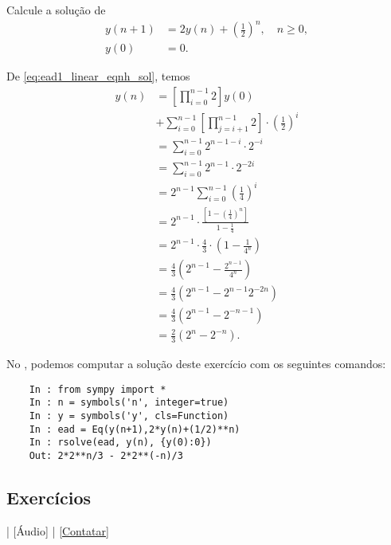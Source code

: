 \begin{exeresol}
  Calcule a solução de
  \begin{align}
    y(n+1) &= 2y(n) + \left(\frac{1}{2}\right)^n,\quad n\geq 0, \\
    y(0) &= 0.
  \end{align}
\end{exeresol}
\begin{resol}
  De \eqref{eq:ead1_linear_eqnh_sol}, temos
  \begin{align}
    y(n) &= \left[\prod_{i=0}^{n-1} 2\right]y(0) \nonumber\\
    &+ \sum_{i=0}^{n-1}\left[\prod_{j=i+1}^{n-1} 2\right]\cdot\left(\frac{1}{2}\right)^i \\
    &= \sum_{i=0}^{n-1} 2^{n-1-i}\cdot 2^{-i} \\
    &= \sum_{i=0}^{n-1} 2^{n-1}\cdot 2^{-2i} \\
    &= 2^{n-1}\sum_{i=0}^{n-1}\left(\frac{1}{4}\right)^{i} \\
    &= 2^{n-1}\cdot \frac{\left[1-\left(\frac{1}{4}\right)^n\right]}{1-\frac{1}{4}} \\
    &=2^{n-1}\cdot\frac{4}{3}\cdot\left(1-\frac{1}{4^n}\right)\\
    &= \frac{4}{3}\left(2^{n-1} - \frac{2^{n-1}}{4^n}\right)\\
    &= \frac{4}{3}\left(2^{n-1} - 2^{n-1}2^{-2n}\right)\\
    &= \frac{4}{3}\left(2^{n-1}-2^{-n-1}\right)\\
    &= \frac{2}{3}\left(2^n-2^{-n}\right).
  \end{align}

  \ifispython
  No \python, podemos computar a solução deste exercício com os seguintes comandos:
  \begin{lstlisting}
    In : from sympy import *
    In : n = symbols('n', integer=true)
    In : y = symbols('y', cls=Function)
    In : ead = Eq(y(n+1),2*y(n)+(1/2)**n)
    In : rsolve(ead, y(n), {y(0):0})
    Out: 2*2**n/3 - 2*2**(-n)/3
  \end{lstlisting}
  \fi  
\end{resol}

\subsection*{Exercícios}

\begin{flushright}
  [Vídeo] | [Áudio] | \href{https://phkonzen.github.io/notas/contato.html}{[Contatar]}
\end{flushright}

